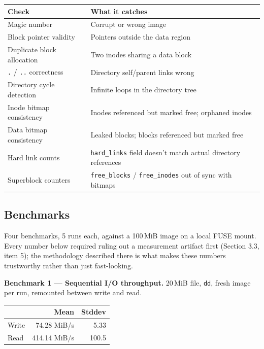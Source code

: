 \documentclass[11pt]{article}
\begin{document}
\begin{center}
\begin{tabular}{p{5.4cm}p{8.4cm}}
\toprule
\textbf{Check} & \textbf{What it catches} \\
\midrule
Magic number & Corrupt or wrong image \\
Block pointer validity & Pointers outside the data region \\
Duplicate block allocation & Two inodes sharing a data block \\
\texttt{.} / \texttt{..} correctness & Directory self/parent links wrong \\
Directory cycle detection & Infinite loops in the directory tree \\
Inode bitmap consistency & Inodes referenced but marked free; orphaned inodes \\
Data bitmap consistency & Leaked blocks; blocks referenced but marked free \\
Hard link counts & \texttt{hard\_links} field doesn't match actual directory references \\
Superblock counters & \texttt{free\_blocks} / \texttt{free\_inodes} out of sync with bitmaps \\
\bottomrule
\end{tabular}
\end{center}

\subsection{Benchmarks}

Four benchmarks, 5 runs each, against a 100\,MiB image on a local FUSE mount. Every number below
required ruling out a measurement artifact first (Section 3.3, item 5); the methodology described
there is what makes these numbers trustworthy rather than just fast-looking.

\textbf{Benchmark 1 --- Sequential I/O throughput.} 20\,MiB file, \texttt{dd}, fresh image per run,
remounted between write and read.

\begin{center}
\begin{tabular}{lrr}
\toprule
 & \textbf{Mean} & \textbf{Stddev} \\
\midrule
Write & 74.28 MiB/s & 5.33 \\
Read  & 414.14 MiB/s & 100.5 \\
\bottomrule
\end{tabular}
\end{center}
\end{document}
